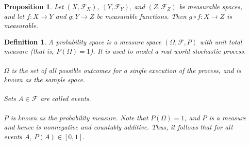 \documentclass[1pt]{report}
\newtheorem{prop}[thm]{Proposition}
\newtheorem{defn}[thm]{Definition}
\newcommand{\<}{\langle}
\renewcommand{\>}{\rangle}
\newcommand{\FF}{\mathcal{F}}
\begin{document}
\begin{prop}\label{prop:measurablecomposition}
Let $(X, \FF_X)$, $(Y, \FF_Y)$, and $(Z, \FF_Z)$ be measurable spaces, and let $f:X \to Y$ and $g: Y\to Z$ be measurable functions. Then $g\circ f : X \to Z$ is measurable.
\end{prop}
\begin{defn} \label{def:probabilityspace}
A \emph{probability space} is a measure space $(\Omega, \FF, P)$ with unit total measure (that is, $P(\Omega) = 1$). It is used to model a real world stochastic process.\\
\\
$\Omega$ is the set of all possible outcomes for a single execution of the process, and is known as the \emph{sample space}.\\
\\
Sets $A \in \FF$ are called \emph{events}.\\
\\
$P$ is known as the \emph{probability measure}. Note that $P(\Omega) = 1$, and $P$ is a measure and hence is nonnegative and countably additive. Thus, it follows that for all events $A$, $P(A) \in [0,1]$.
\end{defn}
\end{document}
